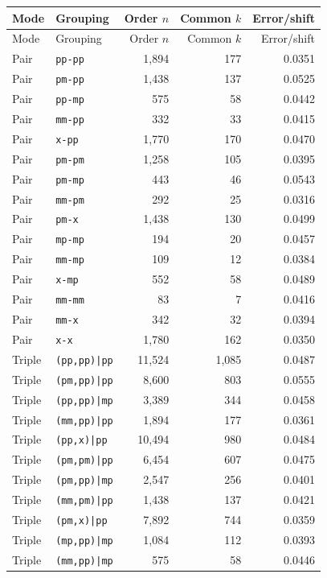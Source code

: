 \begin{longtable}{@{}llrrr@{}}
\toprule Mode&Grouping&Order $n$&Common $k$&Error/shift\\\midrule\endfirsthead
\toprule Mode&Grouping&Order $n$&Common $k$&Error/shift\\\midrule\endhead
Pair & \texttt{pp-pp} & 1,894 & 177 & 0.0351 \\
Pair & \texttt{pm-pp} & 1,438 & 137 & 0.0525 \\
Pair & \texttt{pp-mp} & 575 & 58 & 0.0442 \\
Pair & \texttt{mm-pp} & 332 & 33 & 0.0415 \\
Pair & \texttt{x-pp} & 1,770 & 170 & 0.0470 \\
Pair & \texttt{pm-pm} & 1,258 & 105 & 0.0395 \\
Pair & \texttt{pm-mp} & 443 & 46 & 0.0543 \\
Pair & \texttt{mm-pm} & 292 & 25 & 0.0316 \\
Pair & \texttt{pm-x} & 1,438 & 130 & 0.0499 \\
Pair & \texttt{mp-mp} & 194 & 20 & 0.0457 \\
Pair & \texttt{mm-mp} & 109 & 12 & 0.0384 \\
Pair & \texttt{x-mp} & 552 & 58 & 0.0489 \\
Pair & \texttt{mm-mm} & 83 & 7 & 0.0416 \\
Pair & \texttt{mm-x} & 342 & 32 & 0.0394 \\
Pair & \texttt{x-x} & 1,780 & 162 & 0.0350 \\
Triple & \texttt{(pp,pp)|pp} & 11,524 & 1,085 & 0.0487 \\
Triple & \texttt{(pm,pp)|pp} & 8,600 & 803 & 0.0555 \\
Triple & \texttt{(pp,pp)|mp} & 3,389 & 344 & 0.0458 \\
Triple & \texttt{(mm,pp)|pp} & 1,894 & 177 & 0.0361 \\
Triple & \texttt{(pp,x)|pp} & 10,494 & 980 & 0.0484 \\
Triple & \texttt{(pm,pm)|pp} & 6,454 & 607 & 0.0475 \\
Triple & \texttt{(pm,pp)|mp} & 2,547 & 256 & 0.0401 \\
Triple & \texttt{(mm,pm)|pp} & 1,438 & 137 & 0.0421 \\
Triple & \texttt{(pm,x)|pp} & 7,892 & 744 & 0.0359 \\
Triple & \texttt{(mp,pp)|mp} & 1,084 & 112 & 0.0393 \\
Triple & \texttt{(mm,pp)|mp} & 575 & 58 & 0.0446 \\

\end{longtable}

